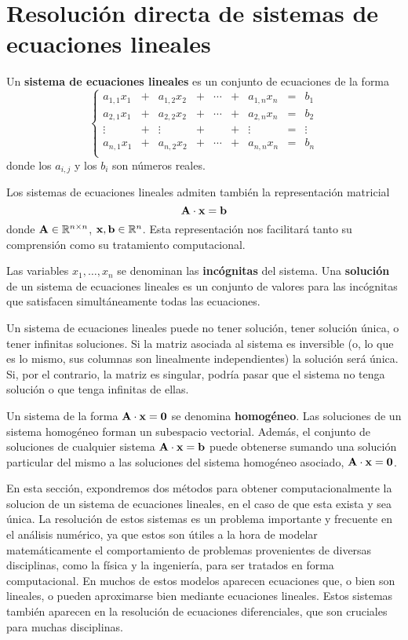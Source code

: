 
\section{Resolución directa de sistemas de ecuaciones lineales}
\label{section:sistemas-lineales}

Un \textbf{sistema de ecuaciones lineales} es un conjunto de ecuaciones de la
forma
\[ \left\lbrace \begin{matrix}
    a_{1,1} x_1 &+& a_{1,2} x_2 &+& \cdots &+& a_{1,n} x_n & = & b_1    \\
    a_{2,1} x_1 &+& a_{2,2} x_2 &+& \cdots &+& a_{2,n} x_n & = & b_2    \\
    \vdots     &+& \vdots     &+&     &+& \vdots     & = & \vdots \\
    a_{n,1} x_1 &+& a_{n,2} x_2 &+& \cdots &+& a_{n,n} x_n & = & b_n    \\
\end{matrix} \right. \]
donde los $a_{i,j}$ y los $b_i$ son números reales.

Los sistemas de ecuaciones lineales admiten también la representación
matricial
\[ \mathbf{A} \cdot \mathbf{x} = \mathbf{b} \]
donde $\mathbf{A} \in \mathbb{R} ^{n \times n}$, $\mathbf{x}, \mathbf{b} \in \mathbb{R}^{n}$.
Esta representación nos facilitará tanto su comprensión como su tratamiento
computacional.

Las variables $x_1, \dots, x_n$ se denominan las \textbf{incógnitas} del
sistema.
Una \textbf{solución} de un sistema de ecuaciones lineales es un conjunto de
valores para las incógnitas que satisfacen simultáneamente todas las
ecuaciones.

Un sistema de ecuaciones lineales puede no tener solución, tener solución
única, o tener infinitas soluciones. Si la matriz asociada al sistema es
inversible (o, lo que es lo mismo, sus columnas son linealmente
independientes) la solución será única. Si, por el contrario, la matriz es
singular, podría pasar que el sistema no tenga solución o que tenga infinitas
de ellas.

Un sistema de la forma $\mathbf{A} \cdot \mathbf{x} = \mathbf{0}$ se denomina
\textbf{homogéneo}. Las soluciones de un sistema homogéneo forman un
subespacio vectorial. Además, el conjunto de soluciones de cualquier sistema
$\mathbf{A} \cdot \mathbf{x} = \mathbf{b}$ puede obtenerse sumando una solución
particular del mismo a las soluciones del sistema homogéneo asociado, $\mathbf{A}
\cdot \mathbf{x} = \mathbf{0}$.

En esta sección, expondremos dos métodos para obtener computacionalmente la
solucion de un sistema de ecuaciones lineales, en el caso de que esta exista y
sea única. La resolución de estos sistemas es un problema importante y
frecuente en el análisis numérico, ya que estos son útiles a la hora de
modelar matemáticamente el comportamiento de problemas provenientes de
diversas disciplinas, como la física y la ingeniería, para ser tratados en
forma computacional. En muchos de estos modelos aparecen ecuaciones
que, o bien son lineales, o pueden aproximarse bien mediante ecuaciones
lineales. Estos sistemas también aparecen en la resolución de ecuaciones
diferenciales, que son cruciales para muchas disciplinas.

